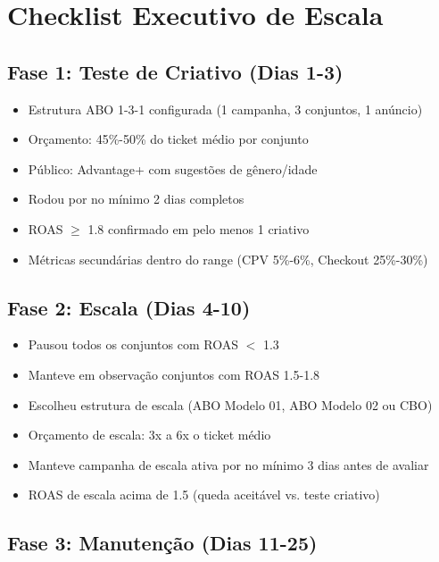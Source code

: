 \documentclass[12pt, a4paper]{article}
\begin{document}
\needspace{10cm}

\pagebreak

\section{Checklist Executivo de Escala}

\subsection{Fase 1: Teste de Criativo (Dias 1-3)}

\begin{itemize}
    \item[$\square$] Estrutura ABO 1-3-1 configurada (1 campanha, 3 conjuntos, 1 anúncio)
    \item[$\square$] Orçamento: 45\%-50\% do ticket médio por conjunto
    \item[$\square$] Público: Advantage+ com sugestões de gênero/idade
    \item[$\square$] Rodou por no mínimo 2 dias completos
    \item[$\square$] ROAS $\geq$ 1.8 confirmado em pelo menos 1 criativo
    \item[$\square$] Métricas secundárias dentro do range (CPV 5\%-6\%, Checkout 25\%-30\%)
\end{itemize}

\subsection{Fase 2: Escala (Dias 4-10)}

\begin{itemize}
    \item[$\square$] Pausou todos os conjuntos com ROAS $<$ 1.3
    \item[$\square$] Manteve em observação conjuntos com ROAS 1.5-1.8
    \item[$\square$] Escolheu estrutura de escala (ABO Modelo 01, ABO Modelo 02 ou CBO)
    \item[$\square$] Orçamento de escala: 3x a 6x o ticket médio
    \item[$\square$] Manteve campanha de escala ativa por no mínimo 3 dias antes de avaliar
    \item[$\square$] ROAS de escala acima de 1.5 (queda aceitável vs. teste criativo)
\end{itemize}

\subsection{Fase 3: Manutenção (Dias 11-25)}
\end{document}
